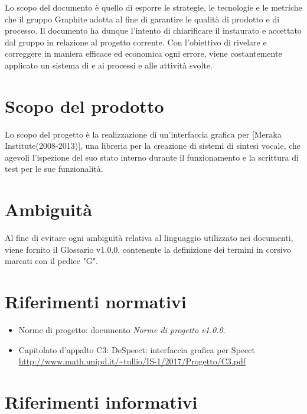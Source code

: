 \documentclass[openany,12pt,a4paper]{report}
\begin{document}
    Lo scopo del documento è quello di esporre le strategie, le tecnologie e le metriche che il gruppo Graphite adotta al fine di garantire le qualità di prodotto e di processo. Il documento ha dunque l'intento di chiarificare il  instaurato e accettato dal gruppo in relazione al progetto corrente. Con l'obiettivo di rivelare e correggere in maniera efficace ed economica ogni errore, viene costantemente applicato un sistema di  e  ai processi e alle attività svolte.
    
    \section{Scopo del prodotto}
    
    Lo scopo del progetto è la realizzazione di un’interfaccia grafica per  [Meraka Institute(2008-2013)], una libreria per la creazione di sistemi di sintesi vocale, che agevoli l’ispezione del suo stato interno durante il funzionamento e la scrittura di test per le sue funzionalità.
    
    \section{Ambiguità}
    
    Al fine di evitare ogni ambiguità relativa al linguaggio utilizzato nei documenti, viene fornito il Glossario v1.0.0, contenente la definizione dei termini in corsivo marcati con il pedice "G".
    
    \section{Riferimenti normativi}
    
    \begin{itemize}
    
        \item{Norme di progetto:} documento \textit{Norme di progetto v1.0.0}.
        
        \item{Capitolato d'appalto C3:} DeSpeect: interfaccia grafica per Speect \\ \url{http://www.math.unipd.it/~tullio/IS-1/2017/Progetto/C3.pdf}
    
    \end{itemize}
    
    \section{Riferimenti informativi}
    
\end{document}
